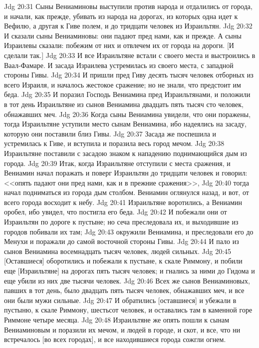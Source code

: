 \vs Jdg 20:31 Сыны Вениаминовы выступили против народа и отдалились от города, и начали, как прежде, убивать из народа на дорогах, из которых одна идет к Вефилю, а другая к Гиве полем, и  до тридцати человек из Израильтян.
\vs Jdg 20:32 И сказали сыны Вениаминовы: они падают пред нами, как и прежде. А сыны Израилевы сказали: побежим от них и отвлечем их от города на дороги. [И сделали так.]
\vs Jdg 20:33 И все Израильтяне встали с своего места и выстроились в Ваал-Фамаре. И засада Израилева устремилась из своего места, с западной стороны Гивы.
\vs Jdg 20:34 И пришли пред Гиву десять тысяч человек отборных из всего Израиля, и началось жестокое сражение; но  не знали, что предстоит им беда.
\vs Jdg 20:35 И поразил Господь Вениамина пред Израильтянами, и положили в тот день Израильтяне из сынов Вениамина двадцать пять тысяч сто человек, обнажавших меч.
\vs Jdg 20:36 Когда сыны Вениамина увидели, что они поражены, тогда Израильтяне уступили место сынам Вениамина, ибо надеялись на засаду, которую они поставили близ Гивы.
\vs Jdg 20:37 Засада же поспешила и устремилась к Гиве, и вступила и поразила весь город мечом.
\vs Jdg 20:38 Израильтяне поставили с засадою  знаком к нападению поднимающийся дым из города.
\vs Jdg 20:39 Итак, когда Израильтяне отступили с места сражения, и Вениамин начал поражать и поверг Израильтян до тридцати человек и говорил: <<опять падают они пред нами, как и в прежние сражения>>,
\vs Jdg 20:40 тогда начал подниматься из города дым столбом. Вениамин оглянулся назад, и вот,  от всего города восходит к небу.
\vs Jdg 20:41 Израильтяне воротились, а Вениамин оробел, ибо увидел, что постигла его беда.
\vs Jdg 20:42 И побежали они от Израильтян по дороге к пустыне; но сеча преследовала их, и выходившие из городов побивали их там;
\vs Jdg 20:43 окружили Вениамина, и преследовали его до Менухи и поражали до самой восточной стороны Гивы.
\vs Jdg 20:44 И пало из сынов Вениамина восемнадцать тысяч человек, людей сильных.
\vs Jdg 20:45 [Оставшиеся] оборотились и побежали к пустыне, к скале Риммону, и побили еще [Израильтяне] на дорогах пять тысяч человек; и гнались за ними до Гидома и еще убили из них две тысячи человек.
\vs Jdg 20:46 Всех же сынов Вениаминовых, павших в тот день, было двадцать пять тысяч человек, обнажавших меч, и все они были мужи сильные.
\vs Jdg 20:47 И обратились [оставшиеся] и убежали в пустыню, к скале Риммону, шестьсот человек, и оставались там в каменной горе Риммоне четыре месяца.
\vs Jdg 20:48 Израильтяне же опять пошли к сынам Вениаминовым и поразили их мечом, и людей в городе, и скот, и все, что ни встречалось [во всех городах], и все находившиеся  города сожгли огнем.

